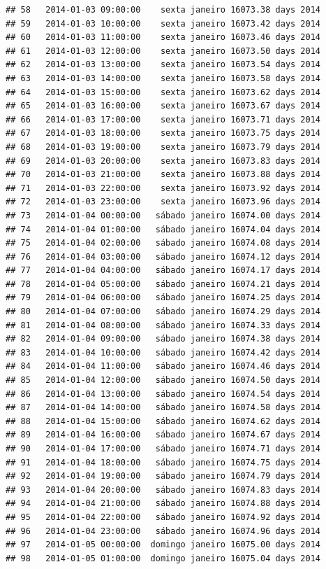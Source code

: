 \documentclass[]{book}
\begin{document}
\begin{verbatim}
## 58   2014-01-03 09:00:00    sexta janeiro 16073.38 days 2014
## 59   2014-01-03 10:00:00    sexta janeiro 16073.42 days 2014
## 60   2014-01-03 11:00:00    sexta janeiro 16073.46 days 2014
## 61   2014-01-03 12:00:00    sexta janeiro 16073.50 days 2014
## 62   2014-01-03 13:00:00    sexta janeiro 16073.54 days 2014
## 63   2014-01-03 14:00:00    sexta janeiro 16073.58 days 2014
## 64   2014-01-03 15:00:00    sexta janeiro 16073.62 days 2014
## 65   2014-01-03 16:00:00    sexta janeiro 16073.67 days 2014
## 66   2014-01-03 17:00:00    sexta janeiro 16073.71 days 2014
## 67   2014-01-03 18:00:00    sexta janeiro 16073.75 days 2014
## 68   2014-01-03 19:00:00    sexta janeiro 16073.79 days 2014
## 69   2014-01-03 20:00:00    sexta janeiro 16073.83 days 2014
## 70   2014-01-03 21:00:00    sexta janeiro 16073.88 days 2014
## 71   2014-01-03 22:00:00    sexta janeiro 16073.92 days 2014
## 72   2014-01-03 23:00:00    sexta janeiro 16073.96 days 2014
## 73   2014-01-04 00:00:00   sábado janeiro 16074.00 days 2014
## 74   2014-01-04 01:00:00   sábado janeiro 16074.04 days 2014
## 75   2014-01-04 02:00:00   sábado janeiro 16074.08 days 2014
## 76   2014-01-04 03:00:00   sábado janeiro 16074.12 days 2014
## 77   2014-01-04 04:00:00   sábado janeiro 16074.17 days 2014
## 78   2014-01-04 05:00:00   sábado janeiro 16074.21 days 2014
## 79   2014-01-04 06:00:00   sábado janeiro 16074.25 days 2014
## 80   2014-01-04 07:00:00   sábado janeiro 16074.29 days 2014
## 81   2014-01-04 08:00:00   sábado janeiro 16074.33 days 2014
## 82   2014-01-04 09:00:00   sábado janeiro 16074.38 days 2014
## 83   2014-01-04 10:00:00   sábado janeiro 16074.42 days 2014
## 84   2014-01-04 11:00:00   sábado janeiro 16074.46 days 2014
## 85   2014-01-04 12:00:00   sábado janeiro 16074.50 days 2014
## 86   2014-01-04 13:00:00   sábado janeiro 16074.54 days 2014
## 87   2014-01-04 14:00:00   sábado janeiro 16074.58 days 2014
## 88   2014-01-04 15:00:00   sábado janeiro 16074.62 days 2014
## 89   2014-01-04 16:00:00   sábado janeiro 16074.67 days 2014
## 90   2014-01-04 17:00:00   sábado janeiro 16074.71 days 2014
## 91   2014-01-04 18:00:00   sábado janeiro 16074.75 days 2014
## 92   2014-01-04 19:00:00   sábado janeiro 16074.79 days 2014
## 93   2014-01-04 20:00:00   sábado janeiro 16074.83 days 2014
## 94   2014-01-04 21:00:00   sábado janeiro 16074.88 days 2014
## 95   2014-01-04 22:00:00   sábado janeiro 16074.92 days 2014
## 96   2014-01-04 23:00:00   sábado janeiro 16074.96 days 2014
## 97   2014-01-05 00:00:00  domingo janeiro 16075.00 days 2014
## 98   2014-01-05 01:00:00  domingo janeiro 16075.04 days 2014

\end{verbatim}
\end{document}
